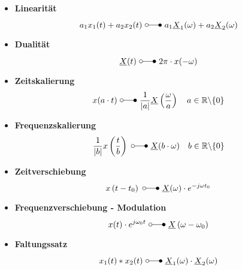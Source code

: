 \begin{mdframed}[style=exercise,nobreak=false]
\begin{itemize}
    \item \textbf{Linearität}
        \[
            a_{1} x_{1}(t)+a_{2} x_{2}(t)\ \laplace\  a_{1} \underline{X}_{1}(\omega)+a_{2} \underline{X}_{2}(\omega)
        \]
    \item \textbf{Dualität}
        \[
            \underline{X}(t)\ \laplace\  2\pi\cdot x(-\omega)
        \]
    \item \textbf{Zeitskalierung}
        \[
            x(a \cdot t)\ \laplace\ \frac{1}{|a|} \underline{X}\left(\frac{\omega}{a}\right) \quad a \in \mathbb{R} \backslash\{0\}
        \]
    \item \textbf{Frequenzskalierung}
        \[
            \frac{1}{|b|} x\left(\frac{t}{b}\right)\ \laplace\ \underline{X}(b\cdot\omega) \quad b \in \mathbb{R} \backslash\{0\}
        \]
    \item \textbf{Zeitverschiebung}
        \[
            x\left(t-t_{0}\right)\ \laplace\ \underline{X}(\omega) \cdot e^{-j \omega t_{0}}
        \]
    \item \textbf{Frequenzverschiebung - Modulation}
        \[
            x(t) \cdot e^{j \omega_{0} t}\ \laplace\ \underline{X}\left(\omega-\omega_{0}\right)
        \]
    \item \textbf{Faltungssatz}
        \[
            x_{1}(t) * x_{2}(t)\ \laplace\ \underline{X}_{1}(\omega) \cdot \underline{X}_{2}(\omega)
\]
\end{itemize}
\end{mdframed}
